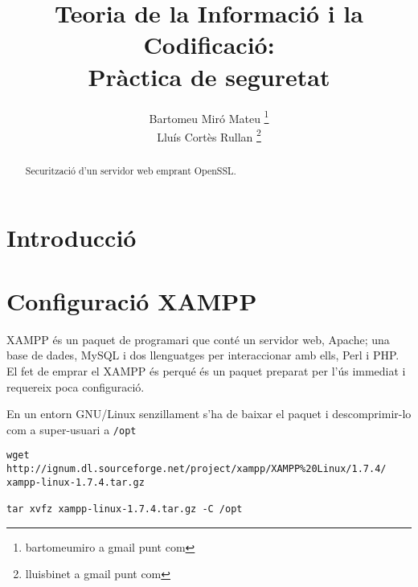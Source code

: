 \documentclass[a4paper,11pt]{scrartcl}
\title{Teoria de la Informació i la Codificació: \\ Pràctica de seguretat}
\author{ Bartomeu Miró Mateu \thanks{bartomeumiro a gmail punt com} \\
	 Lluís Cortès Rullan \thanks{lluisbinet a gmail punt com} }
\begin{document}
  \maketitle

  \begin{abstract}
    \centering
    Securització d'un servidor web emprant OpenSSL.
  \end{abstract}

  \newpage

\section{Introducció}




\section{Configuració XAMPP}
XAMPP és un paquet de programari que conté un servidor web, Apache; una base 
de dades, MySQL i dos llenguatges per interaccionar amb ells, Perl i PHP. El
fet de emprar el XAMPP és perqué és un paquet preparat per l'ús immediat i
requereix poca configuració.

En un entorn GNU/Linux senzillament s'ha de baixar el paquet i descomprimir-lo
com a super-usuari a \texttt{/opt}

\begin{verbatim}
wget http://ignum.dl.sourceforge.net/project/xampp/XAMPP%20Linux/1.7.4/
xampp-linux-1.7.4.tar.gz

tar xvfz xampp-linux-1.7.4.tar.gz -C /opt
\end{verbatim}
\end{document}

